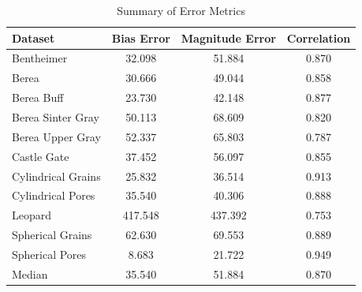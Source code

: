 \begin{table}[h!]
    \centering
    \caption{Summary of Error Metrics}
    \label{tab:metrics_summary}
\begin{tabular}{lccc}
\toprule
Dataset & Bias Error & Magnitude Error & Correlation \\
\midrule
Bentheimer & 32.098 & 51.884 & 0.870 \\
Berea & 30.666 & 49.044 & 0.858 \\
Berea Buff & 23.730 & 42.148 & 0.877 \\
Berea Sinter Gray & 50.113 & 68.609 & 0.820 \\
Berea Upper Gray & 52.337 & 65.803 & 0.787 \\
Castle Gate & 37.452 & 56.097 & 0.855 \\
Cylindrical Grains & 25.832 & 36.514 & 0.913 \\
Cylindrical Pores & 35.540 & 40.306 & 0.888 \\
Leopard & 417.548 & 437.392 & 0.753 \\
Spherical Grains & 62.630 & 69.553 & 0.889 \\
Spherical Pores & 8.683 & 21.722 & 0.949 \\
\hline
Median & 35.540 & 51.884 & 0.870 \\
\bottomrule
\end{tabular}
\end{table}
